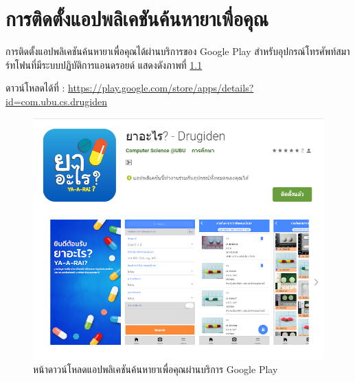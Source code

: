 \chapter{การติดตั้งแอปพลิเคชันค้นหายาเพื่อคุณ}
การติดตั้งแอปพลิเคชันค้นหายาเพื่อคุณได้ผ่านบริการของ Google Play สำหรับอุปกรณ์โทรศัพท์สมาร์ทโฟนที่มีระบบปฏิบัติการแอนดรอยด์ แสดงดังภาพที่ \ref{Fig:download}

ดาวน์โหลดได้ที่ : \url{https://play.google.com/store/apps/details?id=com.ubu.cs.drugiden}

\begin{figure}[H]
    \includegraphics[width=\columnwidth]{Figures/7/download-app}
    \caption{หน้าดาวน์โหลดแอปพลิเคชันค้นหายาเพื่อคุณผ่านบริการ Google Play}
    \label{Fig:download}
\end{figure}